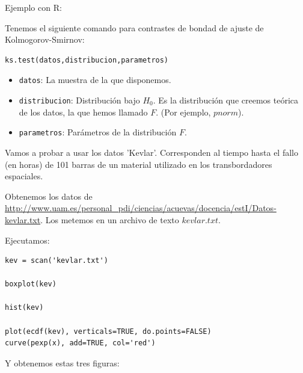 \documentclass[palatino,nochap]{apuntes}
\begin{document}
\begin{example}
Ejemplo con R:

Tenemos el siguiente comando para contrastes de bondad de ajuste de Kolmogorov-Smirnov:
\begin{verbatim}
ks.test(datos,distribucion,parametros)
\end{verbatim}

\begin{itemize}
\item \verb|datos|: La muestra de la que disponemos.
\item \verb|distribucion|: Distribución bajo $H_0$. Es la distribución que creemos teórica de los datos, la que hemos llamado $F$. (Por ejemplo, $pnorm$).
\item \verb|parametros|: Parámetros de la distribución $F$. 
\end{itemize}
Vamos a probar a usar los datos 'Kevlar'. Corresponden al tiempo hasta el fallo (en horas) de 101 barras de un material utilizado en los transbordadores espaciales.

Obtenemos los datos de \url{http://www.uam.es/personal_pdi/ciencias/acuevas/docencia/estI/Datos-kevlar.txt}. Los metemos en un archivo de texto $kevlar.txt$.

Ejecutamos:

\begin{verbatim}
kev = scan('kevlar.txt')

boxplot(kev)

hist(kev)

plot(ecdf(kev), verticals=TRUE, do.points=FALSE)
curve(pexp(x), add=TRUE, col='red')
\end{verbatim}
 
Y obtenemos estas tres figuras:


\end{example}
\end{document}
